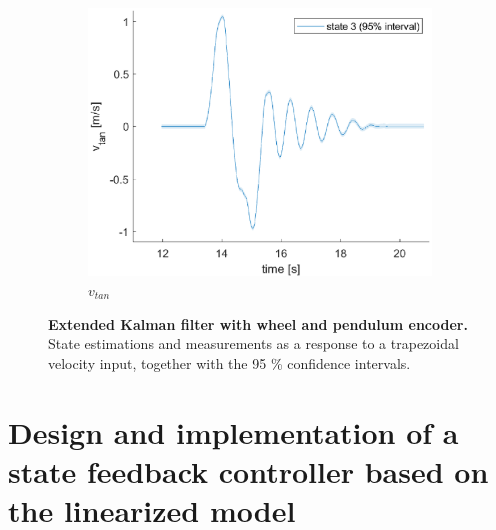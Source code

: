 \documentclass[a4paper,kul]{kulakarticle} %
\begin{document}
\begin{figure}[htp!]
	
	\begin{subfigure}[b]{0.48\textwidth}
		\centering 
		\includegraphics[width=\textwidth]{state3_ext.eps}
		\caption{$v_{tan}$}
	\end{subfigure}
	\caption{\textbf{Extended Kalman filter with wheel and pendulum encoder.} State estimations and measurements as a response to a trapezoidal velocity input, together with the 95 \% confidence intervals.} 
	\label{fig:confidence3}
\end{figure}


	
\section{Design and implementation of a state feedback controller based on the linearized model}
\end{document}
